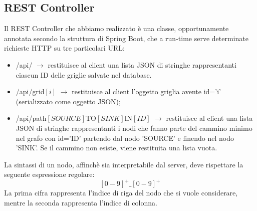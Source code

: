 \subsection{REST Controller}
Il REST Controller che abbiamo realizzato \`e una classe, opportunamente annotata secondo la struttura di Spring Boot, che a run-time serve determinate richieste HTTP su tre particolari URL:
\begin{itemize}
	\item /api/ $\rightarrow$ restituisce al client una lista JSON di stringhe rappresentanti ciascun ID delle griglie salvate nel database.
	\item /api/grid$[i]$ $\rightarrow$ restituisce al client l'oggetto griglia avente id='i'  (serializzato come oggetto JSON);
	\item /api/path$[SOURCE]$TO$[SINK]$IN$[ID]$ $\rightarrow$ restituisce al client una lista JSON di stringhe rappresentanti i nodi che fanno parte del cammino minimo nel grafo con id='ID' partendo dal nodo 'SOURCE' e finendo nel nodo 'SINK'. Se il cammino non esiste, viene restituita una lista vuota.
\end{itemize}
La sintassi di un nodo, affinch\`e sia interpretabile dal server, deve rispettare la seguente espressione regolare:
$$
[0-9]^+\texttt{\_}[0-9]^+
$$
La prima cifra rappresenta l'indice di riga del nodo che si vuole considerare, mentre la seconda rappresenta l'indice di colonna.
